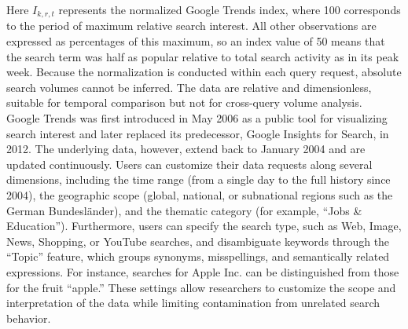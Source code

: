 \documentclass[12pt,a4paper]{article}
\begin{document}
Here \(I_{k,r,t}\) represents the normalized Google Trends index, where 100 corresponds to the period of maximum relative search interest.
All other observations are expressed as percentages of this maximum, so an index value of 50 means that the search term was half as popular relative to total search activity as in its peak week. Because the normalization is conducted within each query request, absolute search volumes cannot be inferred.
The data are relative and dimensionless, suitable for temporal comparison but not for cross-query volume analysis.\\
Google Trends was first introduced in May 2006 as a public tool for visualizing search interest and later replaced its predecessor, Google Insights for Search, in 2012. The underlying data, however, extend back to January 2004 and are updated continuously. Users can customize their data requests along several dimensions, including the time range (from a single day to the full history since 2004), the geographic scope (global, national, or subnational regions such as the German Bundesländer), and the thematic category (for example, “Jobs \& Education”). Furthermore, users can specify the search type, such as Web, Image, News, Shopping, or YouTube searches, and disambiguate keywords through the “Topic” feature, which groups synonyms, misspellings, and semantically related expressions. For instance, searches for Apple Inc. can be distinguished from those for the fruit “apple.”
These settings allow researchers to customize the scope and interpretation of the data while limiting contamination from unrelated search behavior. 
\end{document}
